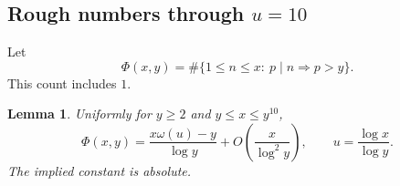 \documentclass{amsart}
\newtheorem{lemma}{Lemma}[section]
\numberwithin{equation}{section}
\numberwithin{table}{section}
\begin{document}
\subsection{Rough numbers through \texorpdfstring{$u=10$}{u=10}}

Let
\[
\Phi(x,y)=\#\{1\le n\le x:\ p\mid n\Rightarrow p>y\}.
\]
This count includes $1$.

\begin{lemma}\label{lem:rough-asymptotic}
Uniformly for $y\ge2$ and $y\le x\le y^{10}$,
\begin{equation}\label{eq:rough-asymptotic}
\Phi(x,y)=\frac{x\omega(u)-y}{\log y}
+O\left(\frac{x}{\log^2y}\right),
\qquad u=\frac{\log x}{\log y}.
\end{equation}
The implied constant is absolute.
\end{lemma}
\end{document}
